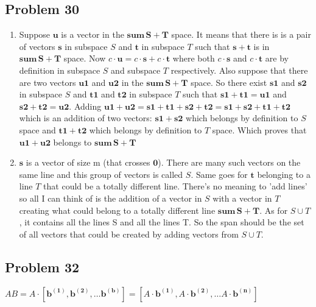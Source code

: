 \documentclass[a4paper,11pt]{article}
\newcommand{\mybf}[1]{\boldsymbol{#1}}
\begin{document}
\subsection*{Problem 30}
\begin{enumerate}[label=\alph*]
\item
Suppose $\mybf{u}$ is a vector in the $\mybf{sum \,S + T}$ space. It means that there is is a pair of vectors $\mybf{s}$ in subspace $S$ and $\mybf{t}$ in subspace $T$ such that $\mybf{s}+\mybf{t}$ is in $\mybf{sum \,S + T}$ space. Now $c\cdot\mybf{u}=c\cdot\mybf{s}+c\cdot\mybf{t}$ where both $c\cdot\mybf{s}$ and $c\cdot\mybf{t}$ are by definition in subspace $S$ and subspace $T$ respectively.
Also suppose that there are two vectors $\mybf{u1}$ and $\mybf{u2}$ in the $\mybf{sum \,S + T}$ space. So there exist $\mybf{s1}$ and $\mybf{s2}$ in subspace $S$ and $\mybf{t1}$ and $\mybf{t2}$ in subspace $T$ such that $\mybf{s1}+\mybf{t1}=\mybf{u1}$ and $\mybf{s2}+\mybf{t2}=\mybf{u2}$. Adding $\mybf{u1} + \mybf{u2} = \mybf{s1}+\mybf{t1}+ \mybf{s2}+\mybf{t2}=\mybf{s1}+\mybf{s2}+\mybf{t1}+\mybf{t2}$ which is an addition of two vectors: $\mybf{s1}+\mybf{s2}$ which belongs by definition to $S$ space and $\mybf{t1}+\mybf{t2}$ which belongs by definition to $T$ space. Which proves that $\mybf{u1} + \mybf{u2}$ belongs to $\mybf{sum \,S + T}$
\item $\mybf{s}$ is a vector of size m (that crosses $\mybf{0}$). There are many such vectors on the same line and this group of vectors is called $S$. Same goes for $\mybf{t}$ belonging to a line $T$ that could be a totally different line. There's no meaning to 'add lines' so all I can think of is the addition of a vector in $S$ with a vector in $T$ creating what could belong to a totally different line $\mybf{sum \,S + T}$. As for $S \cup T$, it contains all the lines S and all the lines T. So the span should be the set of all vectors that could be created by adding vectors from $S\cup T$.
\end{enumerate}
\subsection*{Problem 32}
$AB = A \cdot [\mybf{b^{(1)}},\mybf{b^{(2)}}, \dots \mybf{b^{(b)}} ]  = [A \cdot \mybf{b^{(1)}}, A \cdot \mybf{b^{(2)}}, \dots A \cdot \mybf{b^{(n)}}]$
 
\end{document}
